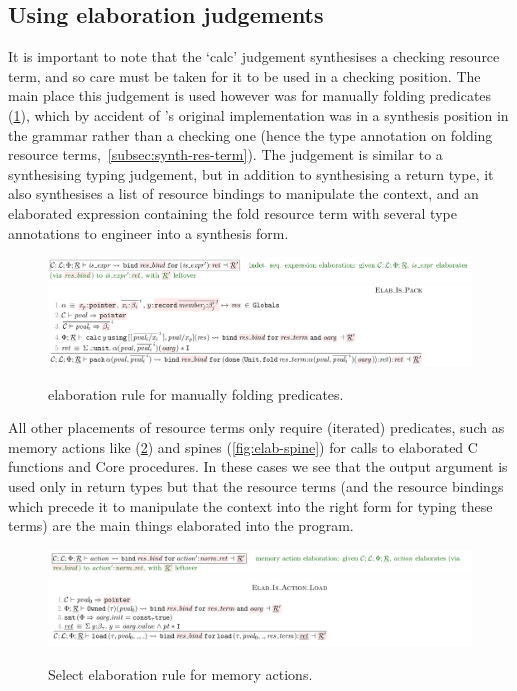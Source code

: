 \subsection{Using elaboration judgements}

It is important to note that the `calc' judgement synthesises a checking
resource term, and so care must be taken for it to be used in a checking
position. The main place this judgement is used however was for manually
folding predicates (\cref{fig:elab-fold}), which by accident of 's
original implementation was in a synthesis position in the grammar rather than
a checking one (hence the type annotation on folding resource
terms,~\cref{subsec:synth-res-term}). The judgement is similar to a
synthesising typing judgement, but in addition to synthesising a return type,
it also synthesises a list of resource bindings to manipulate the context, and
an elaborated expression containing the fold resource term with several type
annotations to engineer into a synthesis form.

\begin{figure}[tp]
    \includegraphics{figures/kernel-elab-fold-1}
    \includegraphics{figures/kernel-elab-fold-2}
    \caption{ elaboration rule for manually folding
        predicates.}\label{fig:elab-fold}
\end{figure}

All other placements of resource terms only require (iterated) predicates, such
as memory actions like  (\cref{fig:elab-action}) and spines
(\cref{fig:elab-spine}) for calls to elaborated C functions and Core
procedures. In these cases we see that the output argument is used only in
return types but that the resource terms (and the resource bindings
which precede it to manipulate the context into the right form for typing these
terms) are the main things elaborated into the program.

\begin{figure}[tp]
    \includegraphics{figures/kernel-elab-action-1}
    \includegraphics{figures/kernel-elab-action-2}
    \caption{Select  elaboration rule for memory
        actions.}\label{fig:elab-action}
\end{figure}

